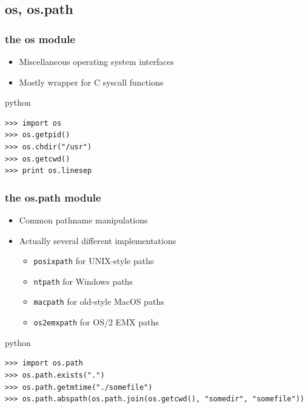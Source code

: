 \documentclass{beamer}
\begin{document}
\subsection{os, os.path} 
\begin{frame}[fragile]
	\frametitle{the os module}
	\begin{itemize}
	\item Miscellaneous operating system interfaces
	\item Mostly wrapper for C syscall functions
	\end{itemize}
	\begin{exampleblock}{python}
	\begin{lstlisting}
>>> import os
>>> os.getpid()
>>> os.chdir("/usr")
>>> os.getcwd()
>>> print os.linesep
	\end{lstlisting}
	\end{exampleblock}
\end{frame}

\begin{frame}[fragile]
	\frametitle{the os.path module}
	
	\begin{itemize}
	\item Common pathname manipulations
	\item Actually several different implementations
	\begin{itemize}
		\item \texttt{posixpath} for UNIX-style paths
		\item \texttt{ntpath} for Windows paths
		\item \texttt{macpath} for old-style MacOS paths
		\item \texttt{os2emxpath} for OS/2 EMX paths
	\end{itemize}
	\end{itemize}
	
	\begin{exampleblock}{python}
	\begin{lstlisting}
>>> import os.path
>>> os.path.exists(".")
>>> os.path.getmtime("./somefile")
>>> os.path.abspath(os.path.join(os.getcwd(), "somedir", "somefile"))
	\end{lstlisting}
	\end{exampleblock}
\end{frame}
\end{document}
